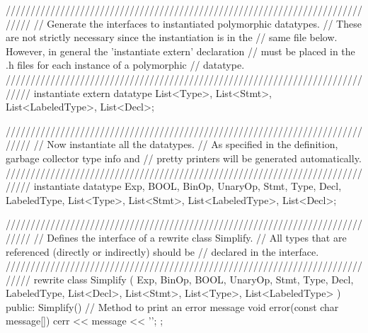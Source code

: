 \begin{prop}
/////////////////////////////////////////////////////////////////////////////
//  Generate the interfaces to instantiated polymorphic datatypes.
//  These are not strictly necessary since the instantiation is in the
//  same file below.  However, in general the 'instantiate extern' declaration
//  must be placed in the .h files for each instance of a polymorphic
//  datatype.
/////////////////////////////////////////////////////////////////////////////
instantiate extern datatype 
   List<Type>, List<Stmt>, List<LabeledType>, List<Decl>;
\end{prop}

\begin{prop}
/////////////////////////////////////////////////////////////////////////////
//  Now instantiate all the datatypes.
//  As specified in the definition, garbage collector type info and
//  pretty printers will be generated automatically.
/////////////////////////////////////////////////////////////////////////////
instantiate datatype Exp, BOOL, BinOp, UnaryOp, Stmt, Type, Decl, LabeledType,
                     List<Type>, List<Stmt>, List<LabeledType>, List<Decl>;

/////////////////////////////////////////////////////////////////////////////
//  Defines the interface of a rewrite class Simplify.
//  All types that are referenced (directly or indirectly) should be
//  declared in the interface.
/////////////////////////////////////////////////////////////////////////////
rewrite class Simplify
   ( Exp, BinOp, BOOL, UnaryOp, Stmt, Type, Decl, LabeledType,
     List<Decl>, List<Stmt>, List<Type>, List<LabeledType>
   )
{
public:
   Simplify() {}
   // Method to print an error message 
   void error(const char message[]) { cerr << message << '\n'; }
};
\end{prop}

